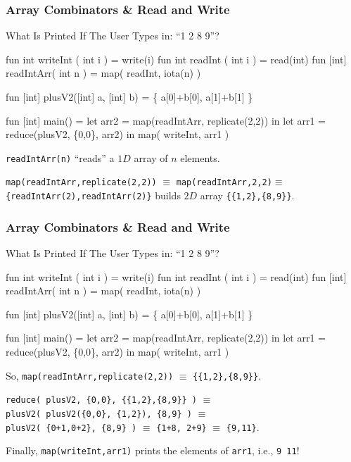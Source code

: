 \documentclass{beamer}
\renewcommand{\emph}[1]{\textcolor{structure}{#1}}
\newcommand{\emp}[1]{\textcolor{DikuRed}{ #1}}
\newcommand{\emphh}[1]{\textcolor{CosGreen}{ #1}}
\begin{document}
\begin{frame}[fragile,t]
\frametitle{Array Combinators \& Read and Write}

\begin{block}{What Is Printed If The User Types in: ``1 2 8 9''?}
\begin{colorcode}
fun  int writeInt   ( int i ) = write(i)
fun  int  readInt   ( int i ) = read(int)
fun [int] readIntArr( int n ) = map( readInt, iota(n) )

fun [int] plusV2([int] a, [int] b) = \{ a[0]+b[0], a[1]+b[1] \}

fun [int] main() = let arr2 = \emphh{map(readIntArr, replicate(2,2))} in
                   let arr1 = \emp{reduce(plusV2, \{0,0\}, arr2)}     in
                       map( writeInt, arr1 )  
\end{colorcode} 
\end{block}
\smallskip
\pause
\emph{{\tt readIntArr(n)}} ``reads'' a $1D$ array of $n$ elements.

\bigskip

\emphh{{\tt map(readIntArr,replicate(2,2))}} $\equiv$ 
{\tt map(readIntArr,{2,2})}$\equiv$\\
    {\tt \{readIntArr(2),readIntArr(2)\}} builds $2D$ array {\tt \{\{1,2\},\{8,9\}\}}.
\end{frame}



\begin{frame}[fragile,t]
\frametitle{Array Combinators \& Read and Write}

\begin{block}{What Is Printed If The User Types in: ``1 2 8 9''?}
\begin{colorcode}
fun  int writeInt   ( int i ) = write(i)
fun  int  readInt   ( int i ) = read(int)
fun [int] readIntArr( int n ) = map( readInt, iota(n) )

fun [int] plusV2([int] a, [int] b) = \{ a[0]+b[0], a[1]+b[1] \}

fun [int] main() = let arr2 = \emphh{map(readIntArr, replicate(2,2))} in
                   let arr1 = \emp{reduce(plusV2, \{0,0\}, arr2)}     in
                       map( writeInt, arr1 )  
\end{colorcode} 
\end{block}

\smallskip

So, \emphh{{\tt map(readIntArr,replicate(2,2))}} $\equiv$ {\tt \{\{1,2\},\{8,9\}\}}.
  
\bigskip

\emp{{\tt reduce( plusV2, \{0,0\}, \{\{1,2\},\{8,9\}\} )}} $\equiv$ \\
\pause
{\tt plusV2( plusV2(\{0,0\}, \{1,2\}), \{8,9\} )} $\equiv$\\
{\tt plusV2( \{0+1,0+2\}, \{8,9\} )} $\equiv$ {\tt \{1+8, 2+9\}} $\equiv$ {\tt \{9,11\}}.

\bigskip

Finally, \emph{{\tt map(writeInt,arr1)}} prints the elements of {\tt arr1}, 
i.e., {\tt 9 11}!
\end{frame}
\end{document}
